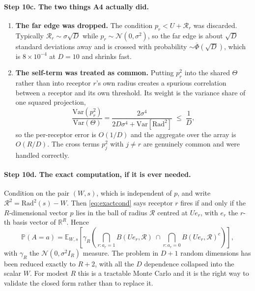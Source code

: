 \documentclass[11pt,a4paper]{article}
\newcommand{\RR}{\mathbb{R}}
\newcommand{\EE}{\mathbb{E}}
\newcommand{\PP}{\mathbb{P}}
\newcommand{\Var}{\mathrm{Var}}
\newcommand{\Phibar}{\overline{\Phi}}
\begin{document}
\paragraph{Step 10c. The two things A4 actually did.}
\begin{enumerate}
  \item \textbf{The far edge was dropped.} The condition $p_r<U+\mathcal{R}_r$ was
    discarded. Typically $\mathcal{R}_r\sim\sigma\sqrt{D}$ while
    $p_r\sim\mathcal{N}(0,\sigma^2)$, so the far edge is about $\sqrt{D}$ standard
    deviations away and is crossed with probability $\sim\Phibar(\sqrt{D})$, which is
    $8\times10^{-4}$ at $D=10$ and shrinks fast.
  \item \textbf{The self-term was treated as common.} Putting $p_r^2$ into the shared
    $\Theta$ rather than into receptor $r$'s own radius creates a spurious correlation
    between a receptor and its own threshold. Its weight is the variance share of one
    squared projection,
    \begin{equation}
      \frac{\Var(p_r^2)}{\Var(\Theta)}=\frac{2\sigma^4}{2D\sigma^4+\Var[\mathrm{Rad}^2]}
      \;\le\;\frac1D ,
    \end{equation}
    so the per-receptor error is $O(1/D)$ and the aggregate over the array is $O(R/D)$.
    The cross terms $p_j^2$ with $j\neq r$ are genuinely common and were handled
    correctly.
\end{enumerate}

\paragraph{Step 10d. The exact computation, if it is ever needed.} Condition on the pair
$(W,s)$, which is independent of $p$, and write
$\mathcal{R}^2=\mathrm{Rad}^2(s)-W$. Then \eqref{eq:exactcond} says receptor $r$ fires if
and only if the $R$-dimensional vector $p$ lies in the ball of radius $\mathcal{R}$
centred at $Ue_r$, with $e_r$ the $r$-th basis vector of $\RR^R$. Hence
\begin{equation}
  \PP(A=a)=\EE_{W,s}\left[\gamma_R\!\left(
    \bigcap_{r:a_r=1}B(Ue_r,\mathcal{R})\ \cap
    \bigcap_{r:a_r=0}B(Ue_r,\mathcal{R})^c\right)\right],
\end{equation}
with $\gamma_R$ the $\mathcal{N}(0,\sigma^2I_R)$ measure. The problem in $D+1$ random
dimensions has been reduced exactly to $R+2$, with all the $D$ dependence collapsed into
the scalar $W$. For modest $R$ this is a tractable Monte Carlo and it is the right way to
validate the closed form rather than to replace it.
\end{document}
